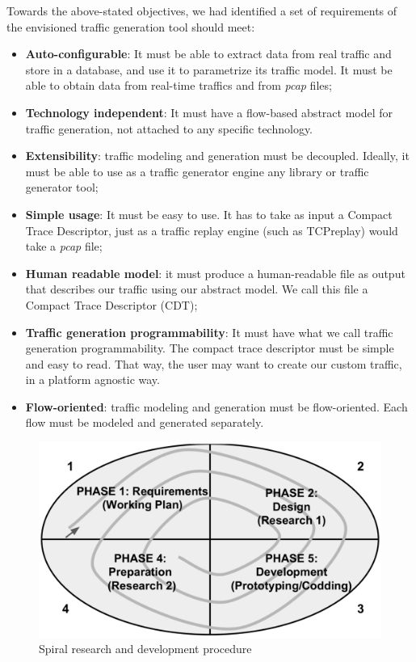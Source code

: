 Towards the above-stated objectives, we  had identified a set of requirements of the envisioned traffic generation tool should meet:

\begin{itemize}

\item \textbf{Auto-configurable}: It must be able to extract data from real traffic and store in a database, and use it to parametrize its traffic model. It must be able to obtain data from real-time traffics and from \textit{pcap} files;

\item \textbf{Technology independent}: It must have a flow-based abstract model for traffic generation, not attached to any specific technology.

\item \textbf{Extensibility}: traffic modeling and generation must be decoupled. Ideally, it must be able to use as a traffic generator engine any library or traffic generator tool;

\item \textbf{Simple usage}: It must be easy to use. It has to take as input a Compact Trace Descriptor, just as a traffic replay engine (such as TCPreplay) would take a \textit{pcap} file;

\item \textbf{Human readable model}: it must produce a human-readable file as output that describes our traffic using our abstract model. We call this file a Compact Trace Descriptor (\acrshort{CDT});

\item \textbf{Traffic generation programmability}: It must have what we call traffic generation programmability. The compact trace descriptor must be simple and easy to read. That way, the user may want to create our custom traffic, in a platform agnostic way.

\item \textbf{Flow-oriented}: traffic modeling and generation must be flow-oriented. Each flow must be modeled and generated separately.

\end{itemize}


\begin{figure}[!ht]
    \centering
    \includegraphics[scale=0.3]{figures/ch1/dev-cicle}
    \caption{Spiral research and development procedure}
    \label{fig:dev-cicle}
\end{figure}

